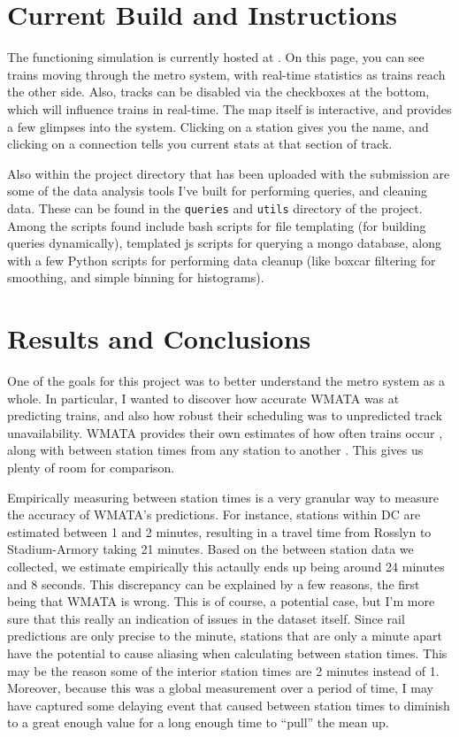 \documentclass[a4paper,12pt]{article}
\begin{document}
\section{Current Build and Instructions}
The functioning simulation is currently hosted at \cite{aprilandchip}. On this page, you can see trains moving through
the metro system, with real-time statistics as trains reach the other side. Also, tracks can be disabled via the
checkboxes at the bottom, which will influence trains in real-time. The map itself is interactive, and provides a few
glimpses into the system. Clicking on a station gives you the name, and clicking on a connection tells you current stats
at that section of track.

Also within the project directory that has been uploaded with the submission are some of the data analysis tools I've
built for performing queries, and cleaning data. These can be found in the \texttt{queries} and \texttt{utils}
directory of the project. Among the scripts found include bash scripts for file templating (for building queries
dynamically), templated js scripts for querying a mongo database, along with a few Python scripts for performing data
cleanup (like boxcar filtering for smoothing, and simple binning for histograms).

\section{Results and Conclusions}
One of the goals for this project was to better understand the metro system as a whole. In particular, I wanted to
discover how accurate WMATA was at predicting trains, and also how robust their scheduling was to unpredicted track
unavailability. WMATA provides their own estimates of how often trains occur \cite{metroschedule}, along with between
station times from any station to another \cite{rosslyntime}. This gives us plenty of room for comparison.

Empirically measuring between station times is a very granular way to measure the accuracy of WMATA's predictions. For
instance, stations within DC are estimated between 1 and 2 minutes, resulting in a travel time from Rosslyn to
Stadium-Armory taking 21 minutes. Based on the between station data we collected, we estimate empirically this actaully
ends up being around 24 minutes and 8 seconds. This discrepancy can be explained by a few reasons, the first being that
WMATA is wrong. This is of course, a potential case, but I'm more sure that this really an indication of issues in the
dataset itself. Since rail predictions are only precise to the minute, stations that are only a minute apart have the
potential to cause aliasing when calculating between station times. This may be the reason some of the interior station
times are 2 minutes instead of 1. Moreover, because this was a global measurement over a period of time, I may have 
captured some delaying event that caused between station times to diminish to a great enough value for a long enough
time to ``pull'' the mean up.
\end{document}
